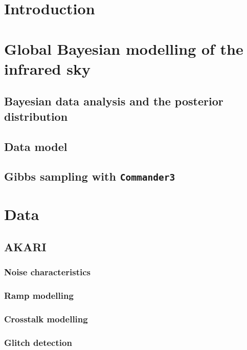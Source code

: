 \documentclass{aa}
\def\commanderthree{\texttt{Commander3}}
\begin{document}
   \maketitle

\setcounter{tocdepth}{2}
\tableofcontents
   
\section{Introduction}

\section{Global Bayesian modelling of the infrared sky}

\subsection{Bayesian data analysis and the posterior distribution}

\subsection{Data model}

\subsection{Gibbs sampling with \commanderthree}

\section{Data}
\subsection{AKARI}
\subsubsection{Noise characteristics}
\subsubsection{Ramp modelling}
\subsubsection{Crosstalk modelling}
\subsubsection{Glitch detection}
\end{document}
